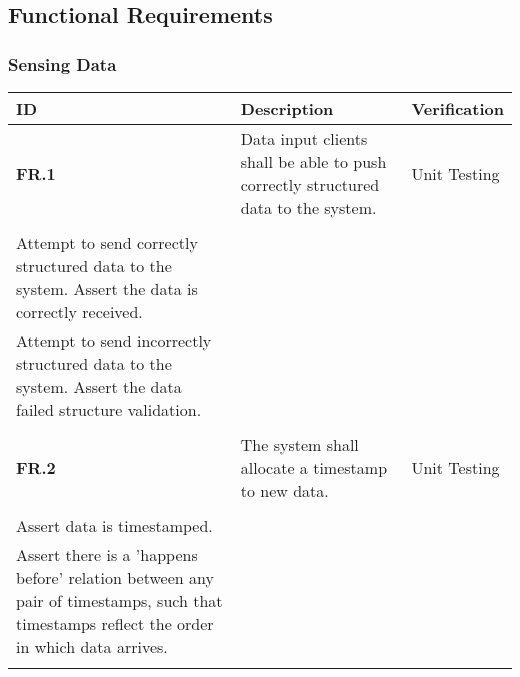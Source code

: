 \subsection{Functional Requirements}
\subsubsection{Sensing Data}
\begin{table}
    \begin{tabular}{|l|l|l}
    	\hline
    	\textbf{ID}   & \textbf{Description}                                                              & \textbf{Verification}                                                                                                                                                                                                                                              \\ \hline
    	\textbf{FR.1} & Data input clients shall be able to push correctly structured data to the system. & Unit Testing\\\begin{itemize}\\\item Attempt to send correctly structured data to the system. Assert the data is correctly received.\\\item Attempt to send incorrectly structured data to the system. Assert the data failed structure validation.\\\end{itemize} \\ \hline
    	\textbf{FR.2} & The system shall allocate a timestamp to new data.                                & Unit Testing\\\begin{itemize}\\\item Assert data is timestamped.\\\item Assert there is a ’happens before’ relation between any pair of timestamps, such that timestamps reflect the order in which data arrives.\\\end{itemize}                                   \\ \hline
	\end{tabular}
\end{table}

